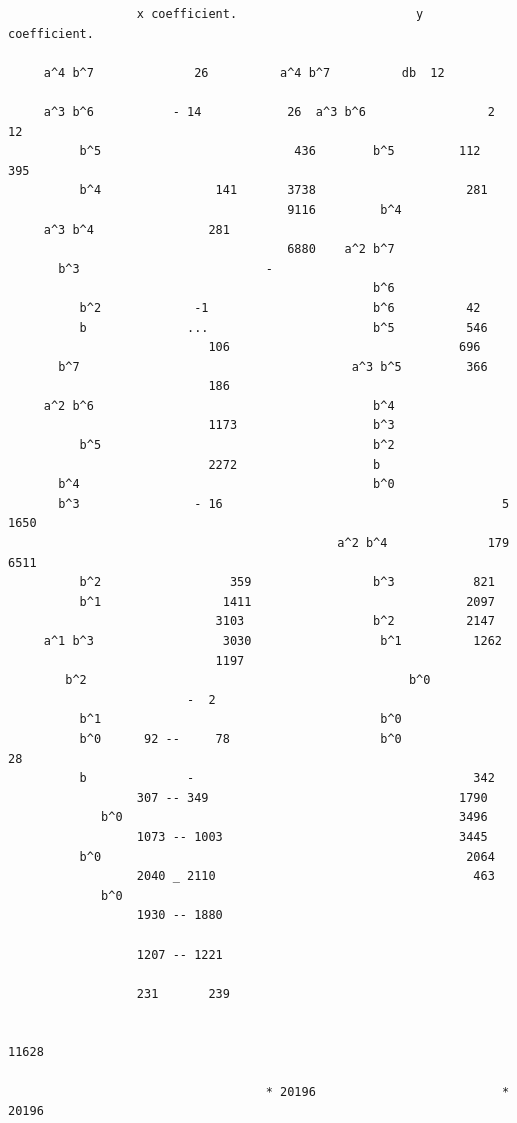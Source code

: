 \documentclass[11pt]{article}
\begin{document}
\begin{small}
\begin{verbatim}
                  x coefficient.                         y coefficient.

     a^4 b^7              26          a^4 b^7          db  12

     a^3 b^6           - 14            26  a^3 b^6                 2          12
          b^5                           436        b^5         112          395
          b^4                141       3738                     281
                                       9116         b^4
     a^3 b^4                281
                                       6880    a^2 b^7
       b^3                          -
                                                   b^6
          b^2             -1                       b^6          42
          b              ...                       b^5          546
                            106                                696
       b^7                                      a^3 b^5         366
                            186
     a^2 b^6                                       b^4
                            1173                   b^3
          b^5                                      b^2
                            2272                   b
       b^4                                         b^0
       b^3                - 16                                       5       1650
                                              a^2 b^4              179        6511
          b^2                  359                 b^3           821
          b^1                 1411                              2097
                             3103                  b^2          2147
     a^1 b^3                  3030                  b^1          1262
                             1197
        b^2                                             b^0
                         -  2
          b^1                                       b^0
          b^0      92 --     78                     b^0              28
          b              -                                       342
                  307 -- 349                                   1790
             b^0                                               3496
                  1073 -- 1003                                 3445
          b^0                                                   2064
                  2040 _ 2110                                    463
             b^0
                  1930 -- 1880

                  1207 -- 1221

                  231       239

                                                                          11628

                                    * 20196                          * 20196
\end{verbatim}
\end{small}
\end{document}
